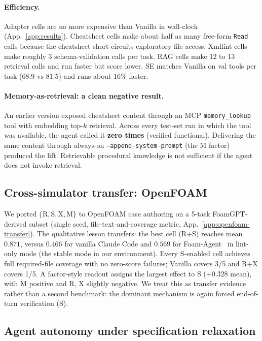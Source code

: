 \documentclass{article}
\begin{document}
\paragraph{Efficiency.}\label{subsec:efficiency} Adapter cells are no more expensive than Vanilla in wall-clock (App.~\ref{app:results}). Cheatsheet cells make about half as many free-form \texttt{Read} calls because the cheatsheet short-circuits exploratory file access. Xmllint cells make roughly 3 schema-validation calls per task. RAG cells make 12 to 13 retrieval calls and run faster but score lower. SE matches Vanilla on val tools per task (68.9 vs 81.5) and runs about 16\% faster.

\paragraph{Memory-as-retrieval: a clean negative result.}\label{subsec:memory-negative} An earlier version exposed cheatsheet content through an MCP \texttt{memory\_lookup} tool with embedding top-$k$ retrieval. Across every test-set run in which the tool was available, the agent called it \textbf{zero times} (verified functional). Delivering the same content through always-on \texttt{--append-system-prompt} (the M factor) produced the lift. Retrievable procedural knowledge is not sufficient if the agent does not invoke retrieval.

\subsection{Cross-simulator transfer: OpenFOAM}
\label{subsec:openfoam-transfer}

We ported $\{\mathrm{R,S,X,M}\}$ to OpenFOAM case authoring on a 5-task FoamGPT-derived subset (single seed, file-text-and-coverage metric, App.~\ref{app:openfoam-transfer}). The qualitative lesson transfers: the best cell (R+S) reaches mean $0.871$, versus $0.466$ for vanilla Claude Code and $0.569$ for Foam-Agent~\citep{foamagent2025} in lint-only mode (the stable mode in our environment). Every $\mathrm{S}$-enabled cell achieves full required-file coverage with no zero-score failures; Vanilla covers 3/5 and R+X covers 1/5. A factor-style readout assigns the largest effect to $\mathrm{S}$ ($+0.328$ mean), with $\mathrm{M}$ positive and $\mathrm{R}$, $\mathrm{X}$ slightly negative. We treat this as transfer evidence rather than a second benchmark: the dominant mechanism is again forced end-of-turn verification ($\mathrm{S}$).

\subsection{Agent autonomy under specification relaxation}
\label{subsec:autonomy}
\end{document}
